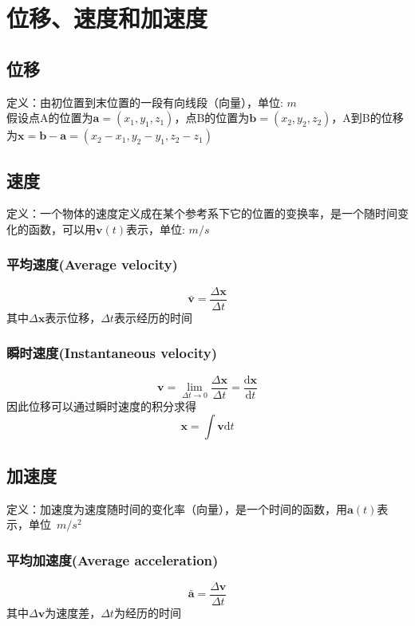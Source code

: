 \documentclass[a4paper,oneside,11pt]{article}
\newcommand{\bol}[1]{\textbf{#1}}
\newcommand{\diff}{\mathrm{d}}
\begin{document}
\section{位移、速度和加速度}
\subsection{位移}
定义：由初位置到末位置的一段有向线段（向量），单位: $m$\\
假设点A的位置为$\bol{a} = (x_1, y_1, z_1)$，点B的位置为$\bol{b} = (x_2, y_2, z_2)$，A到B的位移为$\bol{x} = \bol{b} - \bol{a} = (x_2 - x_1 , y_2 - y_1, z_2 - z_1)$

\subsection{速度}
定义：一个物体的速度定义成在某个参考系下它的位置的变换率，是一个随时间变化的函数，可以用$\bol{v}(t)$表示，单位: $m/s$\\
\subsubsection{平均速度(Average velocity)}
\begin{displaymath}
	\bar{\bol{v}} = \frac{\Delta \bol{x}}{\Delta t}
\end{displaymath}
其中$\Delta \bol{x}$表示位移，$\Delta t$表示经历的时间
\subsubsection{瞬时速度(Instantaneous velocity)}
\begin{displaymath}
	\bol{v} = \lim_{\Delta t \to 0}\frac{\Delta \bol{x}}{\Delta t} = \frac{\diff\bol{x}}{\diff t}
\end{displaymath}
因此位移可以通过瞬时速度的积分求得
\begin{displaymath}
\bol{x} = \int\bol{v}\diff t
\end{displaymath}
\subsection{加速度}
定义：加速度为速度随时间的变化率（向量），是一个时间的函数，用$\bol{a}(t)$表示，单位~$m/s^2$
\subsubsection{平均加速度(Average acceleration)}
\begin{displaymath}
	\bar{\bol{a}} = \frac{\Delta \bol{v}}{\Delta t}
\end{displaymath}
其中$\Delta \bol{v}$为速度差，$\Delta t$为经历的时间
\end{document}
